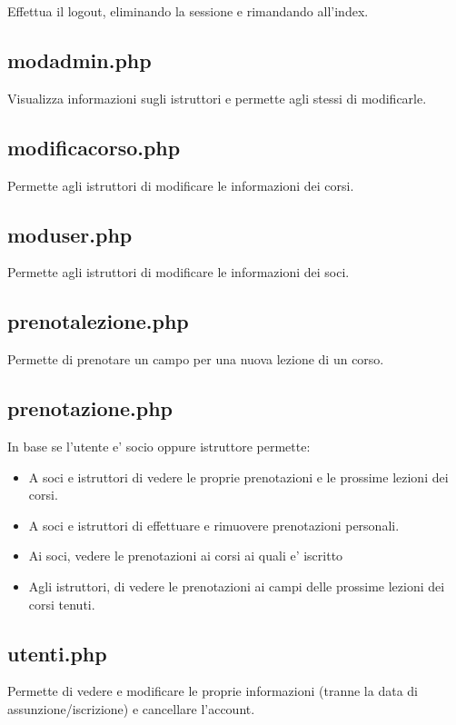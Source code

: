 Effettua il logout, eliminando la sessione e rimandando all'index.

\subsection{modadmin.php}

Visualizza informazioni sugli istruttori e permette agli stessi di modificarle.

\subsection{modificacorso.php}

Permette agli istruttori di modificare le informazioni dei corsi.

\subsection{moduser.php}

Permette agli istruttori di modificare le informazioni dei soci.

\subsection{prenotalezione.php}

Permette di prenotare un campo per una nuova lezione di un corso.

\subsection{prenotazione.php}

In base se l'utente e' socio oppure istruttore permette:
\begin{itemize}
\item A soci e istruttori di vedere le proprie prenotazioni e le prossime lezioni dei corsi.
\item A soci e istruttori di effettuare e rimuovere prenotazioni personali. 
\item Ai soci, vedere le prenotazioni ai corsi ai quali e' iscritto
\item Agli istruttori, di vedere le prenotazioni ai campi delle prossime lezioni dei corsi tenuti.
\end{itemize}

\subsection{utenti.php}

Permette di vedere e modificare le proprie informazioni (tranne la data di assunzione/iscrizione) e cancellare l'account.